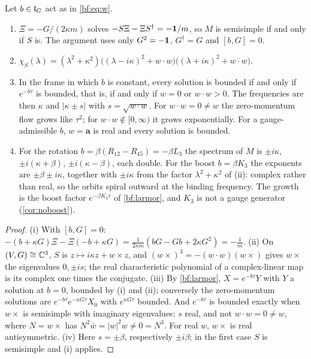 \begin{theorem}
\label{bf:lG}
Let $b\in\mathfrak l_G$ act as in \eqref{bf:eq:w}.
\begin{enumerate}[label=(\roman*),leftmargin=2.2em]
\item $\Xi=-G/(2\kappa m)$ solves $-S\Xi-\Xi S^\dagger=-\mathbf 1/m$, so $M$ is semisimple if and only if $S$ is. The argument uses only $G^2=-\mathbf 1$,
$G^\dagger=G$ and $[b,G]=0$.
\item $\chi_S(\lambda)=(\lambda^2+\kappa^2)\bigl((\lambda-i\kappa)^2+w\cdot w\bigr)\bigl((\lambda+i\kappa)^2+\overline{w\cdot w}\bigr)$.
\item In the frame in which $b$ is constant, every solution is bounded if and only if $e^{-b\tau}$ is bounded, that is, if and only if $w=0$ or
$w\cdot w>0$. The frequencies are then $\kappa$ and $|\kappa\pm s|$ with $s=\sqrt{w\cdot w}$. For $w\cdot w=0\neq w$ the zero-momentum flow grows
like $\tau^2$; for $w\cdot w\notin[0,\infty)$ it grows exponentially. For a gauge-admissible $b$, $w=\mathbf a$ is real and every solution is bounded.
\item For the rotation $b=\beta(R_{12}-R_{45})=-\beta L_3$ the spectrum of $M$ is $\pm i\kappa$, $\pm i(\kappa+\beta)$, $\pm i(\kappa-\beta)$, each
double. For the boost $b=\beta K_3$ the exponents are $\pm\beta\pm i\kappa$, together with $\pm i\kappa$ from the factor $\lambda^2+\kappa^2$ of (ii): complex
rather than real, so the orbits spiral outward at the binding frequency. The growth is the boost factor $e^{-\beta K_3\tau}$ of \cref{bf:larmor}, and $K_3$ is not a gauge generator (\cref{cor:noboost}).
\end{enumerate}
\end{theorem}

\begin{proof}
(i) With $[b,G]=0$: $-(b+\kappa G)\Xi-\Xi(-b+\kappa G)=\frac1{2\kappa m}(bG-Gb+2\kappa G^2)=-\frac1m$. (ii) On $(V,G)\cong\mathbb{C}^3$, $S$ is
$z\mapsto i\kappa z+w\times z$, and $(w\times)^3=-(w\cdot w)(w\times)$ gives $w\times$ the eigenvalues $0,\pm is$; the real characteristic polynomial
of a complex-linear map is its complex one times the conjugate. (iii) By \cref{bf:larmor}, $X=e^{-b\tau}Y$ with $Y$ a solution at $b=0$, bounded by
(i) and (ii); conversely the zero-momentum solutions are $e^{-b\tau}e^{-\kappa G\tau}X_0$ with $e^{\kappa G\tau}$ bounded. And $e^{-b\tau}$ is bounded
exactly when $w\times$ is semisimple with imaginary eigenvalues: $s$ real, and not $w\cdot w=0\neq w$, where $N=w\times$ has
$N^2\bar w=|w|^2w\neq0=N^3$. For real $w$, $w\times$ is real antisymmetric. (iv) Here $s=\pm\beta$, respectively $\pm i\beta$; in the first case $S$ is
semisimple and (i) applies.
\end{proof}

